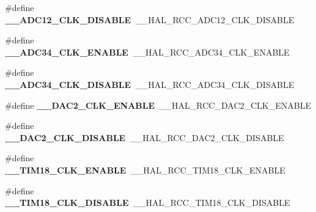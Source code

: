 \begin{DoxyCompactItemize}
\item 
\hypertarget{group___h_a_l___r_c_c___aliased_gabe7e11fce558e2053cdb0ae751126536}{\#define {\bfseries \-\_\-\-\_\-\-A\-D\-C12\-\_\-\-C\-L\-K\-\_\-\-D\-I\-S\-A\-B\-L\-E}~\-\_\-\-\_\-\-H\-A\-L\-\_\-\-R\-C\-C\-\_\-\-A\-D\-C12\-\_\-\-C\-L\-K\-\_\-\-D\-I\-S\-A\-B\-L\-E}\label{group___h_a_l___r_c_c___aliased_gabe7e11fce558e2053cdb0ae751126536}

\item 
\hypertarget{group___h_a_l___r_c_c___aliased_gad254ae5b9760ec6cc0b9be3f542b22db}{\#define {\bfseries \-\_\-\-\_\-\-A\-D\-C34\-\_\-\-C\-L\-K\-\_\-\-E\-N\-A\-B\-L\-E}~\-\_\-\-\_\-\-H\-A\-L\-\_\-\-R\-C\-C\-\_\-\-A\-D\-C34\-\_\-\-C\-L\-K\-\_\-\-E\-N\-A\-B\-L\-E}\label{group___h_a_l___r_c_c___aliased_gad254ae5b9760ec6cc0b9be3f542b22db}

\item 
\hypertarget{group___h_a_l___r_c_c___aliased_ga7d658c3accc90e210938a08bb313a6be}{\#define {\bfseries \-\_\-\-\_\-\-A\-D\-C34\-\_\-\-C\-L\-K\-\_\-\-D\-I\-S\-A\-B\-L\-E}~\-\_\-\-\_\-\-H\-A\-L\-\_\-\-R\-C\-C\-\_\-\-A\-D\-C34\-\_\-\-C\-L\-K\-\_\-\-D\-I\-S\-A\-B\-L\-E}\label{group___h_a_l___r_c_c___aliased_ga7d658c3accc90e210938a08bb313a6be}

\item 
\hypertarget{group___h_a_l___r_c_c___aliased_gae4c367c2fb13b1c443b9c2ead24c2589}{\#define {\bfseries \-\_\-\-\_\-\-D\-A\-C2\-\_\-\-C\-L\-K\-\_\-\-E\-N\-A\-B\-L\-E}~\-\_\-\-\_\-\-H\-A\-L\-\_\-\-R\-C\-C\-\_\-\-D\-A\-C2\-\_\-\-C\-L\-K\-\_\-\-E\-N\-A\-B\-L\-E}\label{group___h_a_l___r_c_c___aliased_gae4c367c2fb13b1c443b9c2ead24c2589}

\item 
\hypertarget{group___h_a_l___r_c_c___aliased_gacfc9ef4fb5d3565351542b14e6d7830e}{\#define {\bfseries \-\_\-\-\_\-\-D\-A\-C2\-\_\-\-C\-L\-K\-\_\-\-D\-I\-S\-A\-B\-L\-E}~\-\_\-\-\_\-\-H\-A\-L\-\_\-\-R\-C\-C\-\_\-\-D\-A\-C2\-\_\-\-C\-L\-K\-\_\-\-D\-I\-S\-A\-B\-L\-E}\label{group___h_a_l___r_c_c___aliased_gacfc9ef4fb5d3565351542b14e6d7830e}

\item 
\hypertarget{group___h_a_l___r_c_c___aliased_ga299d99f2c8deaffbee002dd70a5c8f15}{\#define {\bfseries \-\_\-\-\_\-\-T\-I\-M18\-\_\-\-C\-L\-K\-\_\-\-E\-N\-A\-B\-L\-E}~\-\_\-\-\_\-\-H\-A\-L\-\_\-\-R\-C\-C\-\_\-\-T\-I\-M18\-\_\-\-C\-L\-K\-\_\-\-E\-N\-A\-B\-L\-E}\label{group___h_a_l___r_c_c___aliased_ga299d99f2c8deaffbee002dd70a5c8f15}

\item 
\hypertarget{group___h_a_l___r_c_c___aliased_gad29b4581580af1d318589d2c0403f4ab}{\#define {\bfseries \-\_\-\-\_\-\-T\-I\-M18\-\_\-\-C\-L\-K\-\_\-\-D\-I\-S\-A\-B\-L\-E}~\-\_\-\-\_\-\-H\-A\-L\-\_\-\-R\-C\-C\-\_\-\-T\-I\-M18\-\_\-\-C\-L\-K\-\_\-\-D\-I\-S\-A\-B\-L\-E}\label{group___h_a_l___r_c_c___aliased_gad29b4581580af1d318589d2c0403f4ab}


\end{DoxyCompactItemize}
